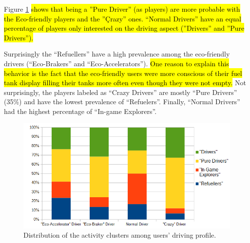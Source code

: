 \documentclass[preprint,authoryear,12pt]{elsarticle}
\begin{document}


Figure \ref{fig:activity_driving} \hl{shows that  being a ''Pure Driver'' (as players) are more probable with the Eco-friendly players and the ''Çrazy'' ones.
``Normal Drivers'' have an equal percentage of players only interested on the driving aspect (''Drivers'' and ''Pure Drivers'').}


Surprisingly the ``Refuellers'' have a high prevalence among the eco-friendly drivers (``Eco-Brakers'' and ``Eco-Accelerators''). \hl{One reason to explain this behavior is the fact that the eco-friendly users were more conscious of their fuel tank display filling their tanks more often even though they were not empty.}
Not surprisingly, the players labeled as ``Crazy Drivers'' are mostly ``Pure Drivers'' (35\%) and have the lowest prevalence of ``Refuelers''.
Finally, ``Normal Drivers'' had the highest percentage of ``In-game Explorers''.


\begin{figure}[htb]
	\begin{center}
		\includegraphics[width=.8\linewidth]{ijhcs14-img/cluster_activities_driver_types}
		\caption{Distribution of the activity clusters among users' driving profile.\label{fig:activity_driving}}
	\end{center}
\end{figure}
\end{document}
